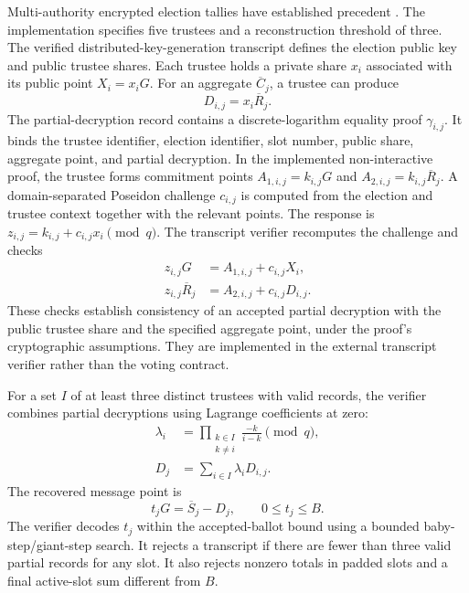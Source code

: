 Multi-authority encrypted election tallies have established precedent
\citep{cramer1997multiauthority}. The implementation specifies five
trustees and a reconstruction threshold of three. The verified distributed-key-generation
transcript defines the election public key and public trustee shares.
Each trustee holds a private share $x_i$ associated with its public point
$X_i=x_iG$. For an aggregate $\overline{C}_j$, a trustee can produce
\begin{equation}
\label{eq:protocol-partial}
D_{i,j}=x_i\overline{R}_j.
\end{equation}
The partial-decryption record contains a discrete-logarithm equality
proof $\gamma_{i,j}$. It binds the trustee identifier, election identifier,
slot number, public share, aggregate point, and partial decryption.
In the implemented non-interactive proof, the trustee forms commitment
points $A_{1,i,j}=k_{i,j}G$ and
$A_{2,i,j}=k_{i,j}\overline{R}_j$. A domain-separated Poseidon challenge
$c_{i,j}$ is computed from the election and trustee context together with
the relevant points. The response is
$z_{i,j}=k_{i,j}+c_{i,j}x_i\pmod q$.
The transcript verifier recomputes the challenge and checks
\begin{equation}
\label{eq:protocol-dleq}
\begin{aligned}
 z_{i,j}G&=A_{1,i,j}+c_{i,j}X_i,\\
 z_{i,j}\overline{R}_j&=A_{2,i,j}+c_{i,j}D_{i,j}.
\end{aligned}
\end{equation}
These checks establish consistency of an accepted partial decryption with
the public trustee share and the specified aggregate point, under the
proof's cryptographic assumptions. They are implemented in the external
transcript verifier rather than the voting contract.

For a set $I$ of at least three distinct trustees with valid records, the
verifier combines partial decryptions using Lagrange coefficients at zero:
\begin{equation}
\label{eq:protocol-lagrange}
\begin{aligned}
 \lambda_i&=\prod_{\substack{k\in I\\k\neq i}}
 \frac{-k}{i-k}\pmod q,\\
 D_j&=\sum_{i\in I}\lambda_iD_{i,j}.
\end{aligned}
\end{equation}
The recovered message point is
\begin{equation}
\label{eq:protocol-tally}
 t_jG=\overline{S}_j-D_j,\qquad 0\leq t_j\leq B.
\end{equation}
The verifier decodes $t_j$ within the accepted-ballot bound using a
bounded baby-step/giant-step search. It rejects a transcript if there are
fewer than three valid partial records for any slot. It also rejects
nonzero totals in padded slots and a final active-slot sum different from
$B$.

